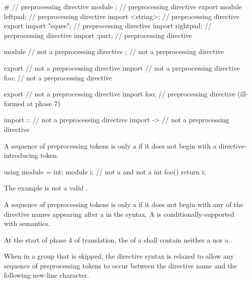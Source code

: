 \begin{example}
\begin{codeblock}
#                       // preprocessing directive
module ;                // preprocessing directive
export module leftpad;  // preprocessing directive
import <string>;        // preprocessing directive
export import "squee";  // preprocessing directive
import rightpad;        // preprocessing directive
import :part;           // preprocessing directive

module                  // not a preprocessing directive
;                       // not a preprocessing directive

export                  // not a preprocessing directive
import                  // not a preprocessing directive
foo;                    // not a preprocessing directive

export                  // not a preprocessing directive
import foo;             // preprocessing directive (ill-formed at phase 7)

import ::               // not a preprocessing directive
import ->               // not a preprocessing directive
\end{codeblock}
\end{example}

\pnum
A sequence of preprocessing tokens is only a 
if it does not begin with a directive-introducing token.
\begin{example}
\begin{codeblock}
using module = int;
module i;               // not a  and not a 
int foo() {
  return i;
}
\end{codeblock}
The example is not a valid .
\end{example}
A sequence of preprocessing tokens is only a 
if it does not begin with any of the directive names
appearing after a \tcode{\#} in the syntax.
A  is
conditionally-supported with
semantics.

\pnum
At the start of phase 4 of translation,
the  of a  shall
contain neither a  nor a .

\pnum
When in a group that is skipped, the directive
syntax is relaxed to allow any sequence of preprocessing tokens to occur between
the directive name and the following new-line character.

